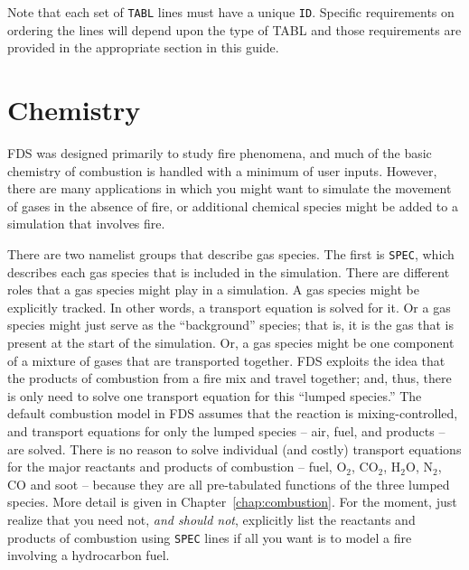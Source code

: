 \documentclass[11pt]{book}
\newcommand{\ct}{\tt\small}
\begin{document}
\begin{warning}
\noindent
Note that each set of {\ct TABL} lines must have a unique {\ct ID}.  Specific requirements on ordering the lines
will depend upon the type of TABL and those requirements are provided in the appropriate section in this guide.
\end{warning}





\chapter{Chemistry}
\label{info:Chemistry}

FDS was designed primarily to study fire phenomena, and much of the basic chemistry of combustion is handled with a minimum of user inputs. However, there
are many applications in which you might want to simulate the movement of gases in the absence of fire, or additional chemical species might be added to a simulation that
involves fire.

There are two namelist groups that describe gas species. The first is {\ct SPEC}, which describes each gas species that is included in the simulation. There are
different roles that a gas species might play in a simulation. A gas
species might be explicitly tracked. In other words, a transport equation is solved for it. Or a gas species might just serve as the ``background'' species; that is, it is
the gas that is present at the start of the simulation. Or, a gas species might be one component of a mixture of
gases that are transported together. FDS exploits the idea that the products of combustion from a fire mix and travel together; and, thus, there is only need to solve
one transport equation for this ``lumped species.'' The default combustion model in FDS assumes that the reaction is mixing-controlled, and
transport equations for only the lumped species -- air, fuel, and products -- are solved.  There is no reason to solve individual (and costly) transport equations
for the major reactants and products of combustion -- fuel, O$_2$, CO$_2$,
H$_2$O, N$_2$, CO and soot -- because they are all pre-tabulated functions of
the three lumped species. More detail is given in Chapter~\ref{chap:combustion}. For the moment, just realize that you need not, {\em and should not},
explicitly list the reactants and products of combustion using {\ct SPEC} lines if all you want is to model a fire involving a hydrocarbon fuel.
\end{document}
